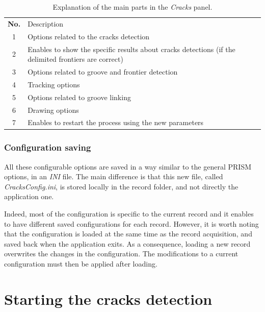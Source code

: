 \begin{table}[h!]
\begin{center}
\tabulinesep=3pt
\begin{tabu} to 0.8\textwidth {| c | X[m] |} %
    \everyrow{\hline}
    \hline
    \rowfont[c] \bfseries
        No. & Description \\
        1 & Options related to the cracks detection \\
        2 & Enables to show the specific results about cracks detections (if the delimited frontiers are correct) \\
        3 & Options related to groove and frontier detection \\
        4 & Tracking options \\
        5 & Options related to groove linking \\
        6 & Drawing options \\
        7 & Enables to restart the process using the new parameters \\
\end{tabu}
\end{center}
\caption{Explanation of the main parts in the \emph{Cracks} panel.}
\label{tab:autoguicontrols}
\end{table}

\subsubsection{Configuration saving}

All these configurable options are saved in a way similar to the general PRISM options, in an \emph{INI} file. The main difference is that this new file, called \emph{CracksConfig.ini}, is stored locally in the record folder, and not directly the application one.

Indeed, most of the configuration is specific to the current record and it enables to have different saved configurations for each record. However, it is worth noting that the configuration is loaded at the same time as the record acquisition, and saved back when the application exits. As a consequence, loading a new record overwrites the changes in the configuration. The modifications to a current configuration must then be applied after loading.

\section{Starting the cracks detection}
\label{sec:setcrackdet}

